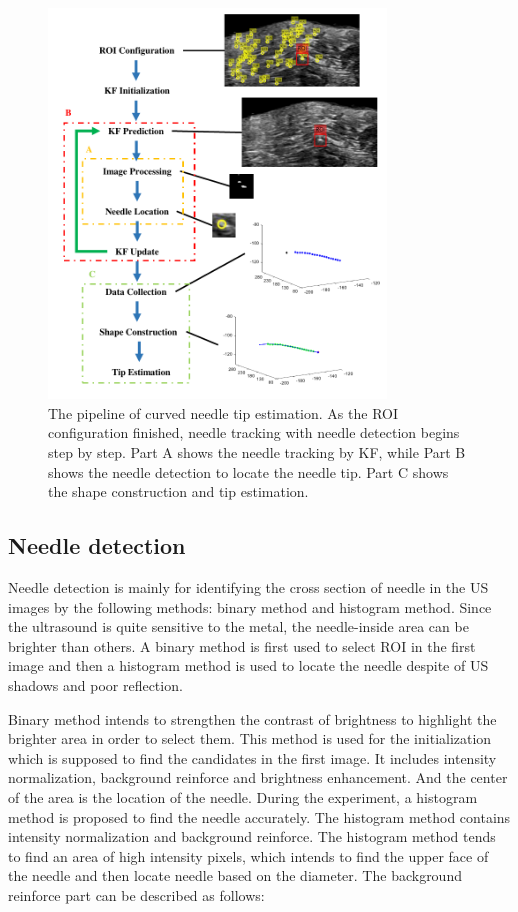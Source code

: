 \documentclass[journal,article,submit,moreauthors,pdftex]{Definitions/mdpi}
\begin{document}
\begin{figure}[H]
    \centering
    \includegraphics[width=0.8\textwidth]{figures/2/f2.pdf}
    \captionsetup{width=16 cm,justification=centering}
    \caption{ The pipeline of curved needle tip estimation. As the ROI configuration finished, needle tracking with needle detection begins step by step. Part A shows the needle tracking by KF, while Part B shows the needle detection to locate the needle tip. Part C shows the shape construction and tip estimation.}
    \label{fig:2}
\end{figure}

\subsection{Needle detection }
Needle detection is mainly for identifying the cross section of needle in the US images by the following methods: binary method and histogram method.
Since the ultrasound is quite sensitive to the metal, the needle-inside area can be brighter than others.
A binary method\cite{Waine2016a} is first used to select ROI in the first image and then a histogram method is used to locate the needle despite of US shadows and poor reflection.

Binary method intends to strengthen the contrast of brightness to highlight the brighter area in order to select them.
This method is used for the initialization which is supposed to find the candidates in the first image.
It includes intensity normalization, background reinforce and brightness enhancement.
And the center of the area is the location of the needle.
During the experiment, a histogram method is proposed to find the needle accurately.
The histogram method contains intensity normalization and background reinforce.
The histogram method tends to find an area of high intensity pixels, which intends to find the upper face of the needle and then locate needle based on the diameter.
The background reinforce part can be described as follows:
\end{document}
